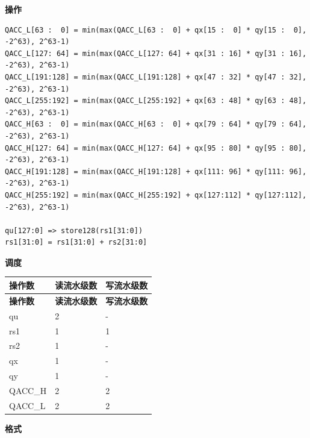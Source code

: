 \textbf{操作}\\
\begin{lstlisting}
QACC_L[63 :  0] = min(max(QACC_L[63 :  0] + qx[15 :  0] * qy[15 :  0], -2^63), 2^63-1)
QACC_L[127: 64] = min(max(QACC_L[127: 64] + qx[31 : 16] * qy[31 : 16], -2^63), 2^63-1)
QACC_L[191:128] = min(max(QACC_L[191:128] + qx[47 : 32] * qy[47 : 32], -2^63), 2^63-1)
QACC_L[255:192] = min(max(QACC_L[255:192] + qx[63 : 48] * qy[63 : 48], -2^63), 2^63-1)
QACC_H[63 :  0] = min(max(QACC_H[63 :  0] + qx[79 : 64] * qy[79 : 64], -2^63), 2^63-1)
QACC_H[127: 64] = min(max(QACC_H[127: 64] + qx[95 : 80] * qy[95 : 80], -2^63), 2^63-1)
QACC_H[191:128] = min(max(QACC_H[191:128] + qx[111: 96] * qy[111: 96], -2^63), 2^63-1)
QACC_H[255:192] = min(max(QACC_H[255:192] + qx[127:112] * qy[127:112], -2^63), 2^63-1)

qu[127:0] => store128(rs1[31:0])
rs1[31:0] = rs1[31:0] + rs2[31:0]
\end{lstlisting}

\textbf{调度}\\
\begin{longtable}[c]{|l|l|l|}
    \hline
    \rowcolor{lightgray}
    \textbf{操作数} & \textbf{读流水级数} & \textbf{写流水级数} \\\hline
    \endfirsthead
    \hline
    \rowcolor{lightgray}
     \textbf{操作数} & \textbf{读流水级数} & \textbf{写流水级数} \\\hline
    \endhead
    \hline
    \endfoot

    qu & 2 & - \\\hline
    rs1 & 1 & 1 \\\hline
    rs2 & 1 & - \\\hline
     qx & 1 & - \\\hline
     qy & 1 & - \\\hline
     QACC\_H & 2 & 2 \\\hline
     QACC\_L & 2 & 2

\end{longtable}

\clearpage
\textbf{格式}\\

